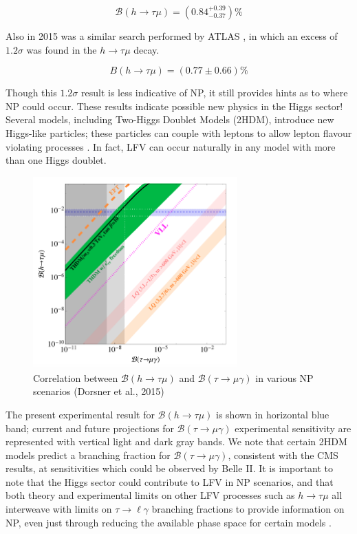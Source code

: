 \documentclass[12pt]{thesis}  %
\newcommand{\br}{\mathcal{B}}
\newcommand{\tmg}{\tau\to\mu\gamma}
\newcommand{\tlg}{\tau\to\ell\gamma}
\newcommand{\htm}{h\to \tau \mu}
\begin{document}
\begin{equation}
\br(h\to \tau \mu) = (0.84^{+0.39}_{-0.37})\%
\end{equation}


Also in 2015 was a similar search performed by ATLAS \cite{ATLAS:2015}, in which an excess of $1.2\sigma$ was found in the $\htm$ decay. 

\begin{equation}
B(\htm) = (0.77 \pm 0.66)\%
\end{equation}

Though this $1.2\sigma$ result is less indicative of NP, it still provides hints as to where NP could occur. These results indicate possible new physics in the Higgs sector! Several models, including Two-Higgs Doublet Models (2HDM), introduce new Higgs-like particles; these particles can couple with leptons to allow lepton flavour violating processes \cite{Harnik:2012}. In fact, LFV can occur naturally in any model with more than one Higgs doublet.


\begin{figure}[h]
\centering
\includegraphics[width=0.7\textwidth]{images/h-vs-tau.png}
\caption{Correlation between $\br(\htm)$ and $\br(\tmg)$ in various NP scenarios (Dorsner et al., 2015)}
\label{}
\end{figure}


The present experimental result for $\br(\htm)$ is shown in horizontal blue band; current and future projections for $\br(\tmg)$ experimental sensitivity are represented with vertical light and dark gray bands. We note that certain 2HDM models predict a branching fraction for $\br(\tmg)$, consistent with the CMS results, at sensitivities which could be observed by Belle II. It is important to note that the Higgs sector could contribute to LFV in NP scenarios, and that both theory and experimental limits on other LFV processes such as $\htm$ all interweave with limits on $\tlg$ branching fractions to provide information on NP, even just through reducing the available phase space for certain models \cite{Dorsner:2015}.
\end{document}

